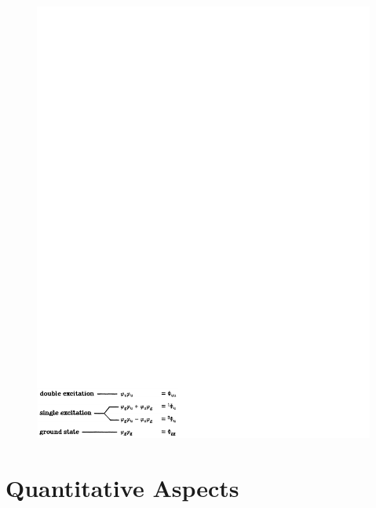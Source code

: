 \begin{figure}
\begin{center}
\includegraphics[scale=0.75]{fig2-22}
\end{center}
\caption{}
\label{fig2-22}
\end{figure}


\section{Quantitative Aspects}
    
